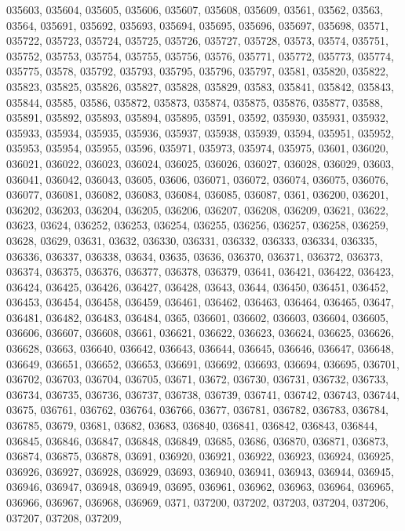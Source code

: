 {035603,
035604,
035605,
035606,
035607,
035608,
035609,
03561,
03562,
03563,
03564,
035691,
035692,
035693,
035694,
035695,
035696,
035697,
035698,
03571,
035722,
035723,
035724,
035725,
035726,
035727,
035728,
03573,
03574,
035751,
035752,
035753,
035754,
035755,
035756,
03576,
035771,
035772,
035773,
035774,
035775,
03578,
035792,
035793,
035795,
035796,
035797,
03581,
035820,
035822,
035823,
035825,
035826,
035827,
035828,
035829,
03583,
035841,
035842,
035843,
035844,
03585,
03586,
035872,
035873,
035874,
035875,
035876,
035877,
03588,
035891,
035892,
035893,
035894,
035895,
03591,
03592,
035930,
035931,
035932,
035933,
035934,
035935,
035936,
035937,
035938,
035939,
03594,
035951,
035952,
035953,
035954,
035955,
03596,
035971,
035973,
035974,
035975,
03601,
036020,
036021,
036022,
036023,
036024,
036025,
036026,
036027,
036028,
036029,
03603,
036041,
036042,
036043,
03605,
03606,
036071,
036072,
036074,
036075,
036076,
036077,
036081,
036082,
036083,
036084,
036085,
036087,
0361,
036200,
036201,
036202,
036203,
036204,
036205,
036206,
036207,
036208,
036209,
03621,
03622,
03623,
03624,
036252,
036253,
036254,
036255,
036256,
036257,
036258,
036259,
03628,
03629,
03631,
03632,
036330,
036331,
036332,
036333,
036334,
036335,
036336,
036337,
036338,
03634,
03635,
03636,
036370,
036371,
036372,
036373,
036374,
036375,
036376,
036377,
036378,
036379,
03641,
036421,
036422,
036423,
036424,
036425,
036426,
036427,
036428,
03643,
03644,
036450,
036451,
036452,
036453,
036454,
036458,
036459,
036461,
036462,
036463,
036464,
036465,
03647,
036481,
036482,
036483,
036484,
0365,
036601,
036602,
036603,
036604,
036605,
036606,
036607,
036608,
03661,
036621,
036622,
036623,
036624,
036625,
036626,
036628,
03663,
036640,
036642,
036643,
036644,
036645,
036646,
036647,
036648,
036649,
036651,
036652,
036653,
036691,
036692,
036693,
036694,
036695,
036701,
036702,
036703,
036704,
036705,
03671,
03672,
036730,
036731,
036732,
036733,
036734,
036735,
036736,
036737,
036738,
036739,
036741,
036742,
036743,
036744,
03675,
036761,
036762,
036764,
036766,
03677,
036781,
036782,
036783,
036784,
036785,
03679,
03681,
03682,
03683,
036840,
036841,
036842,
036843,
036844,
036845,
036846,
036847,
036848,
036849,
03685,
03686,
036870,
036871,
036873,
036874,
036875,
036878,
03691,
036920,
036921,
036922,
036923,
036924,
036925,
036926,
036927,
036928,
036929,
03693,
036940,
036941,
036943,
036944,
036945,
036946,
036947,
036948,
036949,
03695,
036961,
036962,
036963,
036964,
036965,
036966,
036967,
036968,
036969,
0371,
037200,
037202,
037203,
037204,
037206,
037207,
037208,
037209,
}
